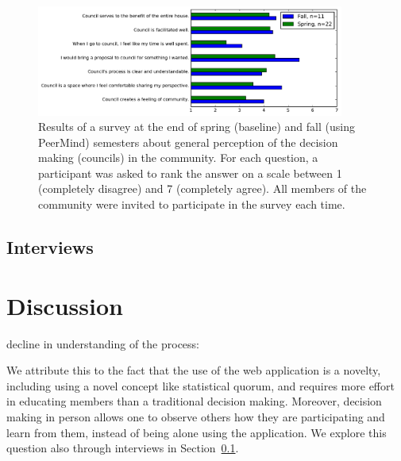 \documentclass[format=acmsmall, review=true, screen=true, anonymous=true]{acmart}
\begin{document}
\begin{figure}[ht]
\centering
\includegraphics[width=0.9\textwidth]{figures/survey-comparison.pdf}
\caption{Results of a survey at the end of spring (baseline) and fall (using PeerMind) semesters about general perception of the decision making (councils) in the community.
For each question, a participant was asked to rank the answer on a scale between 1 (completely disagree) and 7 (completely agree). All members
of the community were invited to participate in the survey each time.}
\label{fig:survey-comparison}
\end{figure}

\subsection{Interviews}
\label{sec:interviews}


\section{Discussion}
\label{sec:discussion}

decline in understanding of the process:

We attribute this to the fact that the use of the web application is
a novelty, including using a novel concept like statistical quorum, and requires more effort
in educating members than a traditional decision making.
Moreover, decision making in person allows one to observe others how they are participating and
learn from them, instead of being alone using the application.
We explore this question also through interviews in Section~\ref{sec:interviews}.
\end{document}
